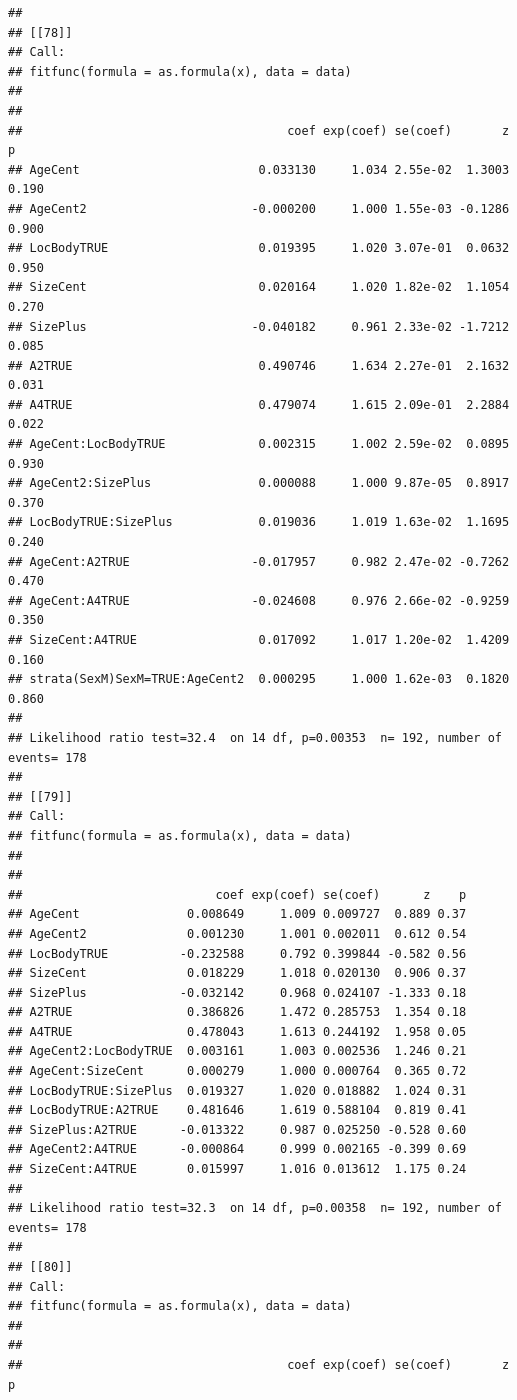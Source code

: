 \documentclass{article}\usepackage[]{graphicx}\usepackage[]{color}
\makeatletter
\newenvironment{kframe}{%
 \def\at@end@of@kframe{}%
 \ifinner\ifhmode%
  \def\at@end@of@kframe{\end{minipage}}%
  \begin{minipage}{\columnwidth}%
 \fi\fi%
 \def\FrameCommand##1{\hskip\@totalleftmargin \hskip-\fboxsep
 \colorbox{shadecolor}{##1}\hskip-\fboxsep
     \hskip-\linewidth \hskip-\@totalleftmargin \hskip\columnwidth}%
 \MakeFramed {\advance\hsize-\width
   \@totalleftmargin\z@ \linewidth\hsize
   \@setminipage}}%
 {\par\unskip\endMakeFramed%
 \at@end@of@kframe}
\newenvironment{knitrout}{}{} %
\makeatother
\begin{document}
\begin{knitrout}
\begin{kframe}
\begin{verbatim}
## 
## [[78]]
## Call:
## fitfunc(formula = as.formula(x), data = data)
## 
## 
##                                     coef exp(coef) se(coef)       z     p
## AgeCent                         0.033130     1.034 2.55e-02  1.3003 0.190
## AgeCent2                       -0.000200     1.000 1.55e-03 -0.1286 0.900
## LocBodyTRUE                     0.019395     1.020 3.07e-01  0.0632 0.950
## SizeCent                        0.020164     1.020 1.82e-02  1.1054 0.270
## SizePlus                       -0.040182     0.961 2.33e-02 -1.7212 0.085
## A2TRUE                          0.490746     1.634 2.27e-01  2.1632 0.031
## A4TRUE                          0.479074     1.615 2.09e-01  2.2884 0.022
## AgeCent:LocBodyTRUE             0.002315     1.002 2.59e-02  0.0895 0.930
## AgeCent2:SizePlus               0.000088     1.000 9.87e-05  0.8917 0.370
## LocBodyTRUE:SizePlus            0.019036     1.019 1.63e-02  1.1695 0.240
## AgeCent:A2TRUE                 -0.017957     0.982 2.47e-02 -0.7262 0.470
## AgeCent:A4TRUE                 -0.024608     0.976 2.66e-02 -0.9259 0.350
## SizeCent:A4TRUE                 0.017092     1.017 1.20e-02  1.4209 0.160
## strata(SexM)SexM=TRUE:AgeCent2  0.000295     1.000 1.62e-03  0.1820 0.860
## 
## Likelihood ratio test=32.4  on 14 df, p=0.00353  n= 192, number of events= 178 
## 
## [[79]]
## Call:
## fitfunc(formula = as.formula(x), data = data)
## 
## 
##                           coef exp(coef) se(coef)      z    p
## AgeCent               0.008649     1.009 0.009727  0.889 0.37
## AgeCent2              0.001230     1.001 0.002011  0.612 0.54
## LocBodyTRUE          -0.232588     0.792 0.399844 -0.582 0.56
## SizeCent              0.018229     1.018 0.020130  0.906 0.37
## SizePlus             -0.032142     0.968 0.024107 -1.333 0.18
## A2TRUE                0.386826     1.472 0.285753  1.354 0.18
## A4TRUE                0.478043     1.613 0.244192  1.958 0.05
## AgeCent2:LocBodyTRUE  0.003161     1.003 0.002536  1.246 0.21
## AgeCent:SizeCent      0.000279     1.000 0.000764  0.365 0.72
## LocBodyTRUE:SizePlus  0.019327     1.020 0.018882  1.024 0.31
## LocBodyTRUE:A2TRUE    0.481646     1.619 0.588104  0.819 0.41
## SizePlus:A2TRUE      -0.013322     0.987 0.025250 -0.528 0.60
## AgeCent2:A4TRUE      -0.000864     0.999 0.002165 -0.399 0.69
## SizeCent:A4TRUE       0.015997     1.016 0.013612  1.175 0.24
## 
## Likelihood ratio test=32.3  on 14 df, p=0.00358  n= 192, number of events= 178 
## 
## [[80]]
## Call:
## fitfunc(formula = as.formula(x), data = data)
## 
## 
##                                     coef exp(coef) se(coef)       z      p

\end{verbatim}
\end{kframe}
\end{knitrout}
\end{document}
